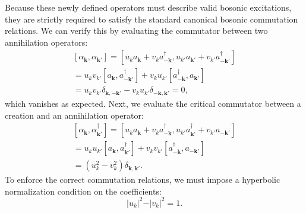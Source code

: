 Because these newly defined operators must describe valid bosonic excitations, they are strictly required to satisfy the standard canonical bosonic commutation relations. We can verify this by evaluating the commutator between two annihilation operators:
\[
    \begin{aligned}
        [\alpha_{\mathbf{k}}, \alpha_{\mathbf{k}'}] = [u_k a_{\mathbf{k}} + v_k a_{-\mathbf{k}}^\dagger, u_{k'} a_{\mathbf{k}'} + v_{k'} a_{-\mathbf{k}'}^\dagger] \\
        = u_k v_{k'} [a_{\mathbf{k}}, a_{-\mathbf{k}'}^\dagger] + v_k u_{k'} [a_{-\mathbf{k}}^\dagger, a_{\mathbf{k}'}]                                            \\
        = u_k v_{k'} \delta_{\mathbf{k}, -\mathbf{k}'} - v_k u_{k'} \delta_{-\mathbf{k}, \mathbf{k}'} = 0,
    \end{aligned}
\]
which vanishes as expected. Next, we evaluate the critical commutator between a creation and an annihilation operator:
\[
    \begin{aligned}
        [\alpha_{\mathbf{k}}, \alpha_{\mathbf{k}'}^\dagger] = [u_k a_{\mathbf{k}} + v_k a_{-\mathbf{k}}^\dagger, u_{k'} a_{\mathbf{k}'}^\dagger + v_{k'} a_{-\mathbf{k}'}] \\
        = u_k u_{k'} [a_{\mathbf{k}}, a_{\mathbf{k}'}^\dagger] + v_k v_{k'} [a_{-\mathbf{k}}^\dagger, a_{-\mathbf{k}'}]                                                    \\
        = (u_k^2 - v_k^2)\delta_{\mathbf{k}, \mathbf{k}'}.
    \end{aligned}
\]
To enforce the correct commutation relations, we must impose a hyperbolic normalization condition on the coefficients:
\begin{equation} \label{eq:bogoliubov_condition}
    \vert u_k \vert^2 - \vert v_k\vert^2 = 1.
\end{equation}

